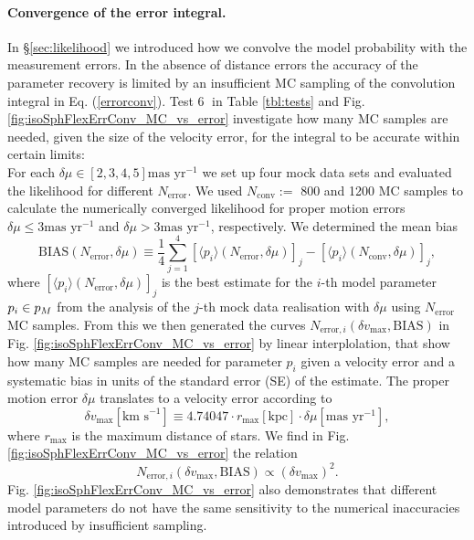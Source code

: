 \paragraph{Convergence of the error integral.} In \S \ref{sec:likelihood} we introduced how we convolve the model probability with the measurement errors. In the absence of distance errors the accuracy of the parameter recovery is limited by an insufficient MC sampling of the convolution integral in Eq. (\ref{errorconv}). Test \textcircled{6} in Table \ref{tbl:tests} and Fig. \ref{fig:isoSphFlexErrConv_MC_vs_error} investigate how many MC samples are needed, given the size of the velocity error, for the integral to be accurate within certain limits:
\\For each $\delta \mu \in [2,3,4,5] \text{mas yr}^{-1}$ we set up four mock data sets and evaluated the likelihood for different $N_\text{error}$. We used $N_\text{conv} :=$ 800 and 1200 MC samples to calculate the numerically converged likelihood for proper motion errors $\delta \mu \leq 3 \text{mas yr}^{-1}$ and $\delta \mu > 3 \text{mas yr}^{-1}$, respectively. We determined the mean bias 
\begin{equation*}
\text{BIAS}(N_\text{error},\delta \mu) \equiv \frac{1}{4} \sum_{j=1}^4 \left[ \langle p_i \rangle (N_\text{error},\delta \mu)\right]_j - \left[ \langle p_i \rangle (N_\text{conv},\delta \mu)\right]_j,
\end{equation*}
where $\left[ \langle p_i \rangle (N_\text{error},\delta \mu)\right]_j$ is the best estimate for the $i$-th model parameter $p_i \in p_M$ from the analysis of the $j$-th mock data realisation with $\delta \mu$ using $N_\text{error}$ MC samples. From this we then generated the curves $N_{\text{error},i} (\delta v_\text{max},\text{BIAS})$ in Fig. \ref{fig:isoSphFlexErrConv_MC_vs_error} by linear interplolation, that show how many MC samples are needed for parameter $p_i$ given a velocity error and a systematic bias in units of the standard error (SE) of the estimate. The proper motion error $\delta \mu$ translates to a velocity error according to 
\begin{equation}
\delta v_\text{max} [\text{km s}^{-1}] \equiv 4.74047 \cdot r_\text{max}[\text{kpc}] \cdot \delta \mu [\text{mas yr}^{-1}], \label{eq:vmax}
\end{equation}
where $r_\text{max}$ is the maximum distance of stars. We find in Fig. \ref{fig:isoSphFlexErrConv_MC_vs_error} the relation
\begin{equation*}
N_{\text{error},i} (\delta v_\text{max},\text{BIAS}) \propto \left( \delta v_\text{max} \right)^2.
\end{equation*}
Fig. \ref{fig:isoSphFlexErrConv_MC_vs_error} also demonstrates that different model parameters do not have the same sensitivity to the numerical inaccuracies introduced by insufficient sampling. 



